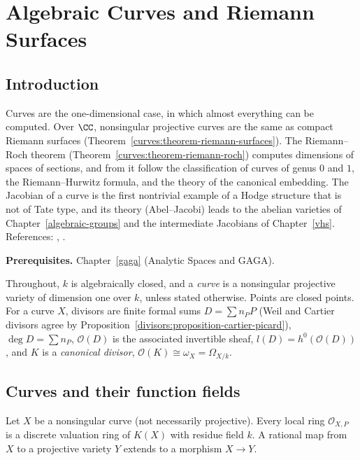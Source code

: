 \chapter{Algebraic Curves and Riemann Surfaces}\label{curves}

\section{Introduction}\label{curves:section-introduction}

Curves are the one-dimensional case, in which almost everything can be computed. Over $\CC$, nonsingular projective curves are the same as
compact Riemann surfaces (Theorem~\ref{curves:theorem-riemann-surfaces}). The Riemann--Roch theorem (Theorem~\ref{curves:theorem-riemann-roch})
computes dimensions of spaces of sections, and from it follow the classification of curves of genus $0$ and $1$, the Riemann--Hurwitz formula, and the
theory of the canonical embedding. The Jacobian of a curve is the first nontrivial example of a Hodge structure that is not of Tate type, and its theory
(Abel--Jacobi) leads to the abelian varieties of Chapter~\ref{algebraic-groups} and the intermediate Jacobians of Chapter~\ref{vhs}.
References: \cite[Chapter IV]{hartshorne-ag}, \cite[Chapter 2]{griffiths-harris}.

\noindent\textbf{Prerequisites.} Chapter~\ref{gaga} (Analytic Spaces and GAGA).

Throughout, $k$ is algebraically closed, and a \emph{curve} is a nonsingular projective variety of dimension one over $k$, unless stated otherwise. Points are closed
points. For a curve $X$, divisors are finite formal sums $D = \sum n_PP$ (Weil and Cartier divisors agree by Proposition~\ref{divisors:proposition-cartier-picard}),
$\deg D = \sum n_P$, $\mathcal{O}(D)$ is the associated invertible sheaf, $l(D) = h^0(\mathcal{O}(D))$, and $K$ is a \emph{canonical divisor}, $\mathcal{O}(K) \cong \omega_X = \Omega_{X/k}$.

\section{Curves and their function fields}\label{curves:section-function-fields}

\begin{proposition}\label{curves:proposition-dvr}
Let $X$ be a nonsingular curve (not necessarily projective). Every local ring $\mathcal{O}_{X,P}$ is a discrete valuation ring of $K(X)$ with residue field $k$. A rational map
from $X$ to a projective variety $Y$ extends to a morphism $X \to Y$.
\end{proposition}

